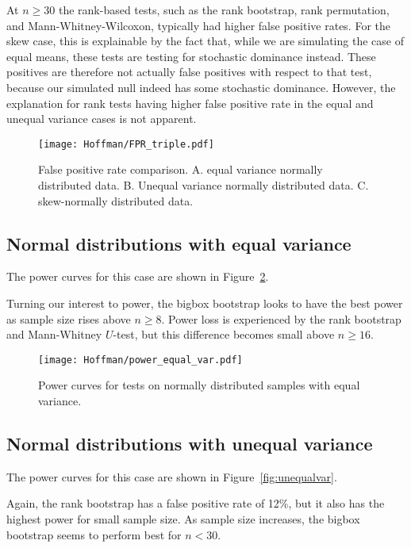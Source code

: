 \documentclass[10pt]{article} %
\begin{document}
At $n\geq30$ the rank-based tests, such as the rank bootstrap, rank permutation, and Mann-Whitney-Wilcoxon, typically had higher false positive rates. For the skew case, this is explainable by the fact that, while we are simulating the case of equal means, these tests are testing for stochastic dominance instead. These positives are therefore not actually false positives with respect to that test, because our simulated null indeed has some stochastic dominance. However, the explanation for rank tests having higher false positive rate in the equal and unequal variance cases is not apparent. 


\begin{figure}
  \texttt{[image: Hoffman/FPR\_triple.pdf]}
  \caption{False positive rate comparison. A. equal variance normally distributed data. B. Unequal variance normally distributed data. C. skew-normally distributed data.}
  \label{fig:fpr}
\end{figure}



\subsection{Normal distributions with equal variance}
The power curves for this case are shown in Figure~\ref{fig:equalvar}. 

Turning our interest to power, the bigbox bootstrap looks to have the best power as sample size rises above $n\geq8$. Power loss is experienced by the rank bootstrap and Mann-Whitney $U$-test, but this difference becomes small above $n\geq16$. 



\begin{figure}
  \texttt{[image: Hoffman/power\_equal\_var.pdf]}
  \caption{Power curves for tests on normally distributed samples with equal variance.}
  \label{fig:equalvar}
\end{figure}





\subsection{Normal distributions with unequal variance}
The power curves for this case are shown in Figure~\ref{fig:unequalvar}. 

Again, the rank bootstrap has a false positive rate of 12\%, but it also has the highest power for small sample size. As sample size increases, the bigbox bootstrap seems to perform best for $n<30$. 
\end{document}
